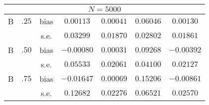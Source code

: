 \begin{tabular}{@{}ccc*{4}{c}@{}}
\midrule
\multicolumn{7}{c}{$N = 5000$} \\
\midrule
B & $.25$ & bias & $0.00113$ & $0.00041$ & $0.06046$ & $0.00130$ \\
& & s.e. & $0.03299$ & $0.01870$ & $0.02802$ & $0.01861$ \\
B & $.50$ & bias & $-0.00080$ & $0.00031$ & $0.09268$ & $-0.00392$ \\
& & s.e. & $0.05533$ & $0.02061$ & $0.04100$ & $0.02127$ \\
B & $.75$ & bias & $-0.01647$ & $0.00069$ & $0.15206$ & $-0.00861$ \\
& & s.e. & $0.12682$ & $0.02276$ & $0.06521$ & $0.02570$ \\
\bottomrule
\end{tabular}